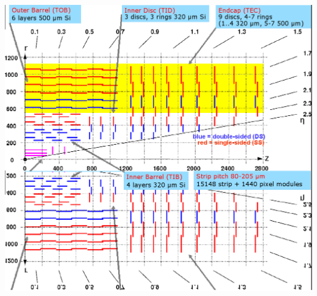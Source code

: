 \documentclass[compress]{beamer}
\begin{document}
\begin{frame}
\begin{columns}
\includegraphics[width=\linewidth]{tracker_map_outertop.png}
\end{columns}
\end{frame}
\end{document}
